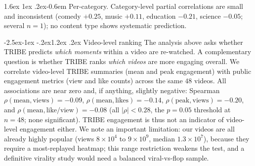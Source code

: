 \documentclass[11pt]{article}
\makeatletter
\renewcommand\subsection{\@startsection{subsection}{2}{\z@}%
  {-2.5ex\@plus -1ex \@minus -.2ex}{1.2ex \@plus .2ex}%
  {\normalfont\normalsize\sffamily\bfseries}}
\renewcommand\paragraph{\@startsection{paragraph}{4}{\z@}%
  {1.6ex \@plus1ex \@minus.2ex}{-0.6em}%
  {\normalfont\normalsize\sffamily\bfseries}}
\makeatother
\begin{document}
\paragraph{Per-category.} Category-level partial correlations are small and inconsistent
(comedy $+0.25$, music $+0.11$, education $-0.21$, science $-0.05$; several $n{=}1$); no content
type shows systematic prediction.

\subsection{Video-level ranking}
The analysis above asks whether TRIBE predicts \emph{which moments} within a video are re-watched.
A complementary question is whether TRIBE ranks \emph{which videos} are more engaging overall. We
correlate video-level TRIBE summaries (mean and peak engagement) with public engagement metrics
(view and like counts) across the same $48$ videos. All associations are near zero and, if
anything, slightly negative: Spearman $\rho(\text{mean},\text{views})=-0.09$,
$\rho(\text{mean},\text{likes})=-0.14$, $\rho(\text{peak},\text{views})=-0.20$, and
$\rho(\text{mean},\text{like/view})=-0.08$ (all $|\rho|<0.28$, the $p{=}0.05$ threshold at
$n{=}48$; none significant). TRIBE engagement is thus not an indicator of video-level engagement
either. We note an important limitation: our videos are all already highly popular (views
$8\!\times\!10^4$ to $9\!\times\!10^9$, median $1.3\!\times\!10^7$), because they require a
most-replayed heatmap; this range restriction weakens the test, and a definitive virality study
would need a balanced viral-vs-flop sample.
\end{document}
